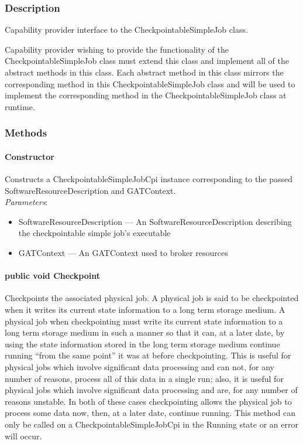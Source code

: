\documentclass[$Date: 2003/06/26 19:29:31 $]{glabarticle}
\begin{document}

\subsubsection{Description}

Capability provider interface to the CheckpointableSimpleJob class.

Capability provider wishing to provide the functionality of the CheckpointableSimpleJob class must extend 
this class and implement all of the abstract methods in this class. Each abstract method in this class 
mirrors the corresponding method in this CheckpointableSimpleJob class and will be used to implement 
the corresponding method in the CheckpointableSimpleJob class at runtime. 


\subsubsection{Methods}

\paragraph{Constructor}

Constructs a CheckpointableSimpleJobCpi instance corresponding to the
passed SoftwareResourceDescription and GATContext. \\

\textit{Parameters}:
\begin{itemize}
\item[] SoftwareResourceDescription --- An SoftwareResourceDescription describing the checkpointable 
simple job's executable
\item[] GATContext --- An GATContext used to broker resources
\end{itemize}

\paragraph{public void Checkpoint}

Checkpoints the associated physical job. A physical job is said to be
checkpointed when it writes its current state information to a long
term storage medium. A physical job when checkpointing must write its
current state information to a long term storage medium in such a
manner so that it can, at a later date, by using the state information
stored in the long term storage medium continue running ``from the
same point'' it was at before checkpointing. This is useful for
physical jobs which involve significant data processing and can not,
for any number of reasons, process all of this data in a single run;
also, it is useful for physical jobs which involve significant data
processing and are, for any number of reasons unstable. In both of
these cases checkpointing allows the physical job to process some data
now, then, at a later date, continue running. This method can only be
called on a CheckpointableSimpleJobCpi in the Running state or an error
will occur. \\
\end{document}
